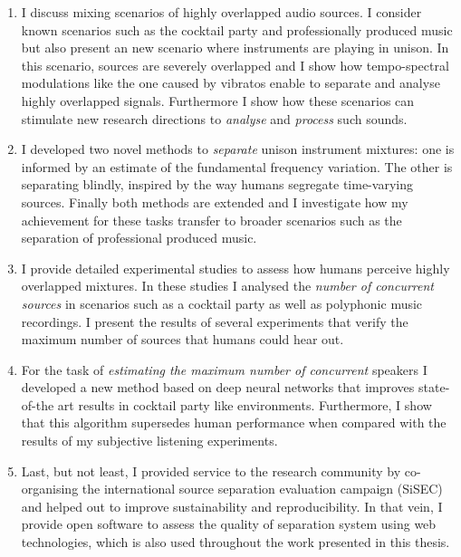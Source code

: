 \begin{enumerate}
\item I discuss mixing scenarios of highly overlapped audio sources.
I consider known scenarios such as the cocktail party and professionally produced music but also present an new scenario where instruments are playing in unison.
In this scenario, sources are severely overlapped and I show how tempo-spectral modulations like the one caused by vibratos enable to separate and analyse highly overlapped signals.
Furthermore I show how these scenarios can stimulate new research directions to \emph{analyse} and \emph{process} such sounds.\\

\item I developed two novel methods to \emph{separate} unison instrument mixtures: one is informed by an estimate of the fundamental frequency variation.
The other is separating blindly, inspired by the way humans segregate time-varying sources.
Finally both methods are extended and I investigate how my achievement for these tasks transfer to broader scenarios such as the separation of professional produced music.\\

\item I provide detailed experimental studies to assess how humans perceive highly overlapped mixtures.
In these studies I analysed the \emph{number of concurrent sources} in scenarios such as a cocktail party as well as polyphonic music recordings.
I present the results of several experiments that verify the maximum number of sources that humans could hear out.\\

\item For the task of \emph{estimating the maximum number of concurrent} speakers I developed a new method based on deep neural networks that improves state-of-the art results in cocktail party like environments.
Furthermore, I show that this algorithm supersedes human performance when compared with the results of my subjective listening experiments.\\

\item Last, but not least, I provided service to the research community by co-organising the international source separation evaluation campaign (SiSEC) and helped out to improve sustainability and reproducibility.
In that vein, I provide open software to assess the quality of separation system using web technologies, which is also used throughout the work presented in this thesis.
\end{enumerate}


